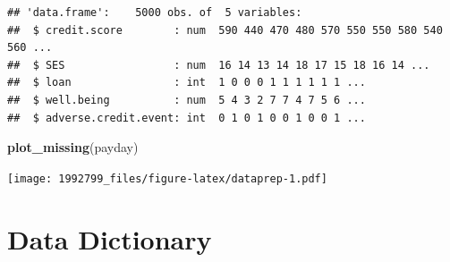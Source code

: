 \documentclass[]{article}
\newenvironment{Shaded}{\begin{snugshade}}{\end{snugshade}}
\newcommand{\KeywordTok}[1]{\textcolor[rgb]{0.13,0.29,0.53}{\textbf{#1}}}
\newcommand{\NormalTok}[1]{#1}
\begin{document}
\begin{verbatim}
## 'data.frame':    5000 obs. of  5 variables:
##  $ credit.score        : num  590 440 470 480 570 550 550 580 540 560 ...
##  $ SES                 : num  16 14 13 14 18 17 15 18 16 14 ...
##  $ loan                : int  1 0 0 0 1 1 1 1 1 1 ...
##  $ well.being          : num  5 4 3 2 7 7 4 7 5 6 ...
##  $ adverse.credit.event: int  0 1 0 1 0 0 1 0 0 1 ...
\end{verbatim}

\begin{Shaded}
\begin{Highlighting}[]
\KeywordTok{plot_missing}\NormalTok{(payday) }
\end{Highlighting}
\end{Shaded}

\texttt{[image: 1992799\_files/figure-latex/dataprep-1.pdf]}

\hypertarget{data-dictionary}{%
\section{Data Dictionary}\label{data-dictionary}}
\end{document}

